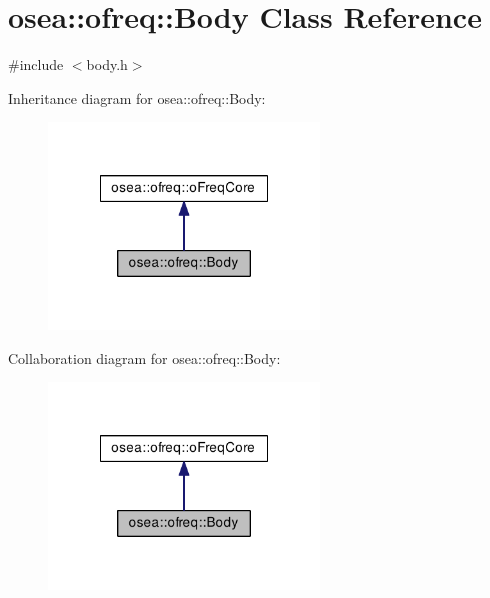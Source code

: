 \hypertarget{classosea_1_1ofreq_1_1_body}{\section{osea\-:\-:ofreq\-:\-:Body Class Reference}
\label{classosea_1_1ofreq_1_1_body}
}


{\ttfamily \#include $<$body.\-h$>$}



Inheritance diagram for osea\-:\-:ofreq\-:\-:Body\-:\nopagebreak
\begin{figure}[H]
\begin{center}
\leavevmode
\includegraphics[width=204pt]{classosea_1_1ofreq_1_1_body__inherit__graph}
\end{center}
\end{figure}


Collaboration diagram for osea\-:\-:ofreq\-:\-:Body\-:\nopagebreak
\begin{figure}[H]
\begin{center}
\leavevmode
\includegraphics[width=204pt]{classosea_1_1ofreq_1_1_body__coll__graph}
\end{center}
\end{figure}
